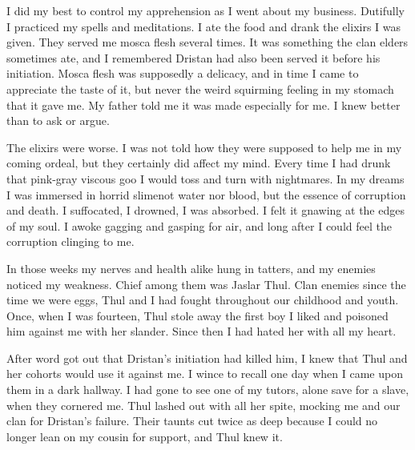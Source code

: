 \documentclass
  [a4paper,
   12pt,
   oneside
  ]%
  {article}
\begin{document}
I did my best to control my apprehension as I went about my business. 
Dutifully I practiced my spells and meditations. 
I ate the food and drank the elixirs I was given. 
They served me mosca flesh several times. 
It was something the clan elders sometimes ate, and I remembered Dristan had also been served it before his initiation. 
Mosca flesh was supposedly a delicacy, and in time I came to appreciate the taste of it, but never the weird squirming feeling in my stomach that it gave me. 
My father told me it was made especially for me. 
I knew better than to ask or argue. 

The elixirs were worse. 
I was not told how they were supposed to help me in my coming ordeal, but they certainly did affect my mind. 
Every time I had drunk that pink-gray viscous goo I would toss and turn with nightmares. 
In my dreams I was immersed in horrid slime\dash not water nor blood, but the essence of corruption and death. 
I suffocated, I drowned, I was absorbed. 
I felt it gnawing at the edges of my soul.
I awoke gagging and gasping for air, and long after I could feel the corruption clinging to me. 

In those weeks my nerves and health alike hung in tatters, and my enemies noticed my weakness.
Chief among them was Jaslar Thul. 
Clan enemies since the time we were eggs, Thul and I had fought throughout our childhood and youth. 
Once, when I was fourteen, Thul stole away the first boy I liked and poisoned him against me with her slander. 
Since then I had hated her with all my heart. 

After word got out that Dristan's initiation had killed him, I knew that Thul and her cohorts would use it against me. 
I wince to recall one day when I came upon them in a dark hallway. 
I had gone to see one of my tutors, alone save for a \human slave, when they cornered me. 
Thul lashed out with all her spite, mocking me and our clan for Dristan's failure. 
Their taunts cut twice as deep because I could no longer lean on my cousin for support, and Thul knew it. 
\end{document}
